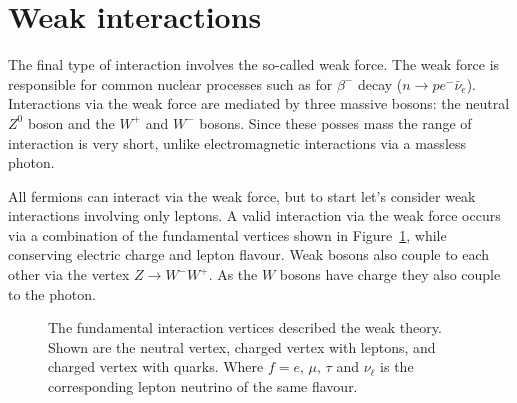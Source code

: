 \section{Weak interactions}\label{sec:TheoryWeakInteractions}

The final type of interaction involves the so-called weak force. The weak force is responsible for common nuclear processes such as for $\beta^{-}$ decay ($n\rightarrow pe^{-}\bar{\nu}_{e}$). Interactions via the weak force are mediated by three massive bosons: the neutral $Z^{0}$ boson and the $W^{+}$ and $W^{-}$ bosons. Since these posses mass the range of interaction is very short, unlike electromagnetic interactions via a massless photon.

All fermions can interact via the weak force, but to start let's consider weak interactions involving only leptons. A valid interaction via the weak force occurs via a combination of the fundamental vertices shown in Figure~\ref{fig:TheoryWeakVertexes}, while conserving electric charge and lepton flavour. Weak bosons also couple to each other via the vertex $Z\rightarrow W^{-}W^{+}$. As the $W$ bosons have charge they also couple to the photon.

\begin{figure}[htbp]
  \centering
    \begin{minipage}[][][t]{.32\textwidth}
      \centering
        
        \label{fig:TheoryWeakNeutralFermions}
    \end{minipage}
    \begin{minipage}[][][t]{.32\textwidth}
      \centering
        
        \label{fig:TheoryWeakChargedLeptons}
    \end{minipage}
    \begin{minipage}[][][t]{.32\textwidth}
      \centering
        
        \label{fig:TheoryWeakChargedQuarks}
    \end{minipage}
    \caption[The fundamental interaction vertices described by the weak theory.]{The fundamental interaction vertices described the weak theory. Shown are the  neutral vertex,  charged vertex with leptons, and  charged vertex with quarks. Where $f=e\textrm{, }\mu\textrm{, }\tau$ and $\nu_{\ell}$ is the corresponding lepton neutrino of the same flavour.}\label{fig:TheoryWeakVertexes}
\end{figure}

